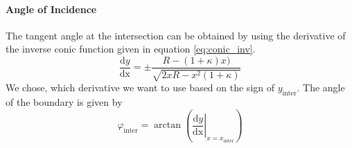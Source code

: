 \documentclass[12pt]{article}
\newcommand{\at}[2]{\left.#1\right|_{#2}}
\newcommand{\deriv}[2]{\frac{\mathrm{d}#1}{\mathrm{d#2}}}
\begin{document}
\paragraph{Angle of Incidence}
The tangent angle at the intersection can be obtained by using the derivative of the
inverse conic function given in equation \eqref{eq:conic_inv}.
\begin{equation}\label{eq:conic_inv_deriv}
  \deriv{y}{x} = \pm \frac{R - (1 + \kappa) x)}{\sqrt{2 x R - x^2(1 + \kappa)}}
\end{equation}
We chose, which derivative we want to use based on the sign of $y_\text{inter}$.
The angle of the boundary is given by
\begin{equation}\label{eq:conic_inter_angle}
  \varphi_\text{inter} = \arctan\left(\at{\deriv{y}{x}}{x = x_\text{inter}}\right)
\end{equation}
\end{document}
